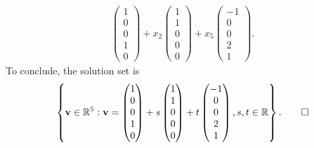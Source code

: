 \documentclass[12pt]{article}
\begin{document}
\begin{enumerate}[label=\textbf{(\alph*)}]
\begin{align*}
\begin{pmatrix}
        1 \\ 0 \\ 0 \\ 1 \\ 0
    \end{pmatrix}+x_2\begin{pmatrix}
        1\\1\\0\\0\\0
    \end{pmatrix}+x_5\begin{pmatrix}
        -1\\0\\0\\2\\1
    \end{pmatrix}.
\end{align*}
To conclude, the solution set is \begin{align*}
    \left\{\mathbf{v}\in\mathbb{R}^5:\mathbf{v}=\begin{pmatrix}
        1 \\ 0 \\ 0 \\ 1 \\ 0
    \end{pmatrix}+s\begin{pmatrix}
        1\\1\\0\\0\\0
    \end{pmatrix}+t\begin{pmatrix}
        -1\\0\\0\\2\\1
    \end{pmatrix},s,t\in\mathbb{R}\right\}. \qed 
\end{align*}
\end{enumerate}
\end{document}
